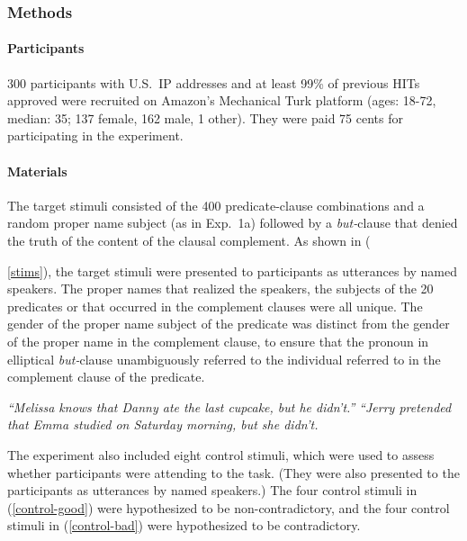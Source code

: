 \documentclass[11pt,fleqn]{article}
\newcommand{\6}{\mbox{$[\hspace*{-.6mm}[$}}
\newcommand{\9}{\mbox{$]\hspace*{-.6mm}]$}}
\begin{document}
\subsubsection{Methods}

\paragraph{Participants} 300 participants with U.S.\ IP addresses and at least 99\% of previous HITs approved were recruited on Amazon's Mechanical Turk platform (ages: 18-72, median: 35; 137 female, 162 male, 1 other). They were paid 75 cents for participating in the experiment.

\paragraph{Materials} The target stimuli consisted of the 400 predicate-clause combinations and a random proper name subject (as in Exp.~1a) followed by a {\em but-}clause that denied the truth of the content of the clausal complement. As shown in ({\ref{stims}), the target stimuli were presented to participants as utterances by named speakers. The proper names that realized the speakers, the subjects of the 20 predicates or that occurred in the complement clauses were all unique. The gender of the proper name subject of the predicate was distinct from the gender of the proper name in the complement clause, to ensure that the pronoun in elliptical {\em but-}clause unambiguously referred to the individual referred to in the complement clause of the predicate.

\begin{exe}
\ex\label{stims}
\begin{xlist}
 {\em ``Melissa knows that Danny ate the last cupcake, but he didn't.''}
 {\em ``Jerry pretended that Emma studied on Saturday morning, but she didn't.}
\end{xlist}
\end{exe}

The experiment also included eight control stimuli, which were used to assess whether participants were attending to the task. (They were also presented to the participants as utterances by named speakers.) The four control stimuli in (\ref{control-good}) were hypothesized to be non-contradictory, and the four control stimuli in (\ref{control-bad}) were hypothesized to be contradictory.

}
\end{document}
